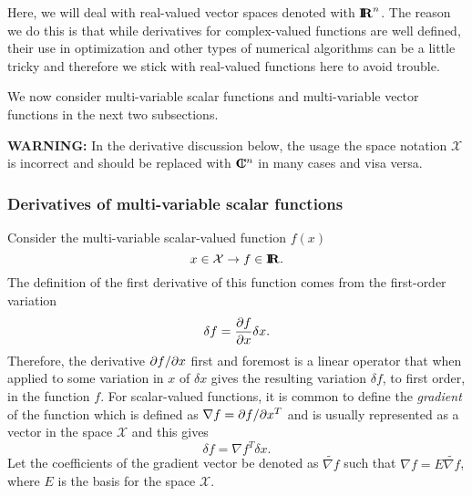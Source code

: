 Here, we will deal with real-valued vector spaces denoted with $\mbox{\textbf{I}}\hspace{-0.6ex}\mbox{\textbf{R}}^n$.  The
reason we do this is that while derivatives for complex-valued functions are
well defined, their use in optimization and other types of numerical
algorithms can be a little tricky and therefore we stick with real-valued
functions here to avoid trouble.

We now consider multi-variable scalar functions and multi-variable vector
functions in the next two subsections.

{}\textbf{WARNING:} In the derivative discussion below, the usage the space
notation $\mathcal{X}$ is incorrect and should be replaced with $\mbox{\textbf{C}}\hspace{-1.1ex}\mbox{l}\hspace{0.4ex}^n$ in
many cases and visa versa.

\subsubsection{Derivatives of multi-variable scalar functions}
\label{sec:scalar_function_derivatives}
 
Consider the multi-variable scalar-valued function $f(x)$
\[
x\in\mathcal{X} \rightarrow f\in\mbox{\textbf{I}}\hspace{-0.6ex}\mbox{\textbf{R}}.
\]
The definition of the first derivative of this function comes from the
first-order variation
\[
\delta f = \displaystyle{\frac{\partial f}{\partial x}} \delta x.
\]
Therefore, the derivative $\partial f / \partial x$ first and foremost is a linear operator
that when applied to some variation in $x$ of $\delta x$ gives the resulting
variation $\delta f$, to first order, in the function $f$.  For scalar-valued
functions, it is common to define the {}\textit{gradient} of the function
which is defined as $\nabla f = \partial f / \partial x^T$ and is usually represented as a
vector in the space $\mathcal{X}$ and this gives
\[
\delta f = {\nabla f}^T \delta x.
\]
Let the coefficients of the gradient vector be denoted as $\tilde{\nabla f}$
such that $\nabla f = E {}\tilde{\nabla f}$, where $E$ is the basis for the
space $\mathcal{X}$.

